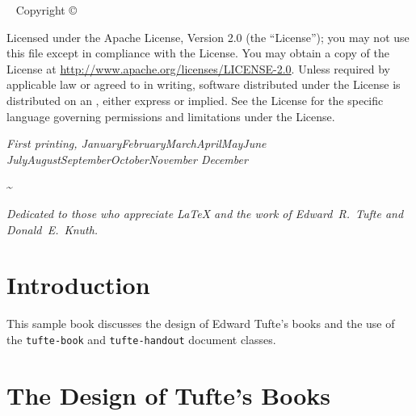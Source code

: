 \documentclass{tufte-book}
\newcommand{\monthyear}{%
  \ifcase\month\or January\or February\or March\or April\or May\or June\or
  July\or August\or September\or October\or November\or
  December\fi\space\number\year
}
\newcommand{\doccls}[1]{\texttt{#1}}%
\begin{document}
\newpage
\begin{fullwidth}
~\vfill
\thispagestyle{empty}
\setlength{\parindent}{0pt}
\setlength{\parskip}{\baselineskip}
Copyright \copyright\ \the\year\ \thanklessauthor

\par{}

\par{}

\par Licensed under the Apache License, Version 2.0 (the ``License''); you may not
use this file except in compliance with the License. You may obtain a copy
of the License at \url{http://www.apache.org/licenses/LICENSE-2.0}. Unless
required by applicable law or agreed to in writing, software distributed
under the License is distributed on an , either express or implied. See the
License for the specific language governing permissions and limitations
under the License.

\par\textit{First printing, \monthyear}
\end{fullwidth}

\tableofcontents

\listoffigures

\listoftables

\cleardoublepage

\textasciitilde{}\vfill

\begin{doublespace}
\noindent\fontsize{18}{22}\selectfont\itshape
\nohyphenation
Dedicated to those who appreciate \LaTeX{} 
and the work of \mbox{Edward R.~Tufte} 
and \mbox{Donald E.~Knuth}.
\end{doublespace}
\vfill
\vfill

\cleardoublepage
\chapter*{Introduction}

This sample book discusses the design of Edward Tufte's
books\cite{Tufte2001,Tufte1990,Tufte1997,Tufte2006} and the use of the
\doccls{tufte-book} and \doccls{tufte-handout} document classes.

\mainmatter

\chapter{The Design of Tufte's Books}
\label{ch:tufte-design}
\end{document}
